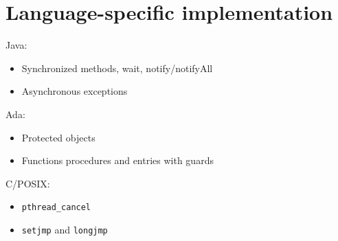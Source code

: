 \section{Language-specific implementation}
Java:
\begin{itemize}
    \item Synchronized methods, wait, notify/notifyAll
    \item Asynchronous exceptions
\end{itemize}
Ada:
\begin{itemize}
    \item Protected objects
    \item Functions procedures and entries with guards
\end{itemize}
C/POSIX:
\begin{itemize}
    \item \texttt{pthread\_cancel}
    \item \texttt{setjmp} and \texttt{longjmp}
\end{itemize}

